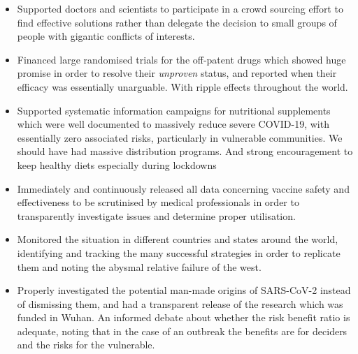 \documentclass[11pt,a4paper,notitlepage]{report}
\begin{document}
\begin{itemize}
  \item Supported doctors and scientists to participate in a crowd sourcing effort to find effective solutions rather than delegate the decision to small groups of people with gigantic conflicts of interests.
  \item Financed large randomised trials for the off-patent drugs which showed huge promise in order to resolve their \textit{unproven} status, and reported when their efficacy was essentially unarguable. With ripple effects throughout the world.
  \item Supported systematic information campaigns for nutritional supplements which were well documented to massively reduce severe COVID-19, with essentially zero associated risks, particularly in vulnerable communities. We should have had massive distribution programs. And strong encouragement to keep healthy diets especially during lockdowns %
  \item Immediately and continuously released all data concerning vaccine safety and effectiveness to be scrutinised by medical professionals in order to transparently investigate issues and determine proper utilisation.
  \item Monitored the situation in different countries and states around the world, identifying and tracking the many successful strategies in order to replicate them and noting the abysmal relative failure of the west.
  \item Properly investigated the potential man-made origins of SARS-CoV-2 instead of dismissing them, and had a transparent release of the research which was funded in Wuhan. An informed debate about whether the risk benefit ratio is adequate, noting that in the case of an outbreak the benefits are for deciders and the risks for the vulnerable.
\end{itemize}

\end{document}
